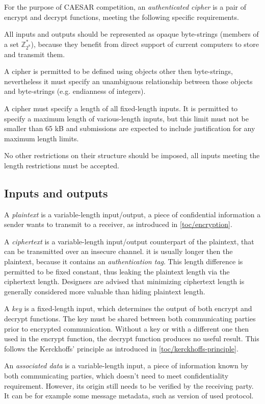 For the purpose of CAESAR competition, an \textit{authenticated cipher} is a pair of encrypt and decrypt functions, meeting the following specific requirements.

All inputs and outputs should be represented as opaque byte-strings (members of a set $\mathbb{Z}_{2^8}^*$), because they benefit from direct support of current computers to store and transmit them.

A cipher is permitted to be defined using objects other then byte-strings, nevertheless it must specify an unambiguous relationship between those objects and byte-strings (e.g. endianness of integers).

A cipher must specify a length of all fixed-length inputs. It is permitted to specify a maximum length of various-length inputs, but this limit must not be smaller than 65 kB and submissions are expected to include justification for any maximum length limits.

No other restrictions on their structure should be imposed, all inputs meeting the length restrictions must be accepted.

\subsection{Inputs and outputs}

A \textit{plaintext} is a variable-length input/output, a piece of confidential information a sender wants to transmit to a receiver, as introduced in \autoref{toc/encryption}.

A \textit{ciphertext} is a variable-length input/output counterpart of the plaintext, that can be transmitted over an insecure channel. it is usually longer then the plaintext, because it contains an \textit{authentication tag}. This length difference is permitted to be fixed constant, thus leaking the plaintext length via the ciphertext length. Designers are advised that minimizing ciphertext length is generally considered more valuable than hiding plaintext length.

A \textit{key} is a fixed-length input, which determines the output of both encrypt and decrypt functions. The key must be shared between both communicating parties prior to encrypted communication. Without a key or with a different one then used in the encrypt function, the decrypt function produces no useful result. This follows the Kerckhoffs' principle as introduced in \autoref{toc/kerckhoffs-principle}.

An \textit{associated data} is a variable-length input, a piece of information known by both communicating parties, which doesn't need to meet confidentiality requirement. However, its origin still needs to be verified by the receiving party. It can be for example some message metadata, such as version of used protocol.

